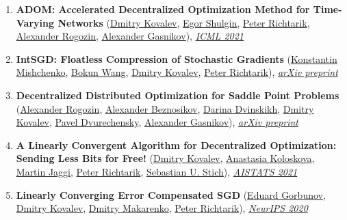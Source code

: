 \begin{enumerate}
\item \textbf{ADOM: Accelerated Decentralized Optimization Method for Time-Varying Networks} (\href{https://www.dmitry-kovalev.com}{\color{linkcolour}Dmitry Kovalev}, \href{https://shulgin-egor.github.io}{\color{linkcolour}Egor Shulgin}, \href{https://richtarik.org}{\color{linkcolour}Peter Richtarik}, \href{https://scholar.google.com/citations?user=sEjyzkgAAAAJ}{\color{linkcolour}Alexander Rogozin}, \href{https://scholar.google.ru/citations?user=AmeE8qkAAAAJ}{\color{linkcolour}Alexander Gasnikov}), \href{http://proceedings.mlr.press/v139/kovalev21a}{\em \color{black}ICML 2021}
\item \textbf{IntSGD: Floatless Compression of Stochastic Gradients} (\href{https://konstmish.github.io}{\color{linkcolour}Konstantin Mishchenko}, \href{https://bokunwang1.github.io}{\color{linkcolour}Bokun Wang}, \href{https://www.dmitry-kovalev.com}{\color{linkcolour}Dmitry Kovalev}, \href{https://richtarik.org}{\color{linkcolour}Peter Richtarik}), \href{https://arxiv.org/abs/2102.08374}{\em \color{black}arXiv preprint}
\item \textbf{Decentralized Distributed Optimization for Saddle Point Problems} (\href{https://scholar.google.com/citations?user=sEjyzkgAAAAJ}{\color{linkcolour}Alexander Rogozin}, \href{https://anbeznosikov.github.io}{\color{linkcolour}Alexander Beznosikov}, \href{https://scholar.google.com/citations?user=5ILnTRsAAAAJ}{\color{linkcolour}Darina Dvinskikh}, \href{https://www.dmitry-kovalev.com}{\color{linkcolour}Dmitry Kovalev}, \href{http://wias-berlin.de/people/dvureche/}{\color{linkcolour}Pavel Dvurechensky}, \href{https://scholar.google.ru/citations?user=AmeE8qkAAAAJ}{\color{linkcolour}Alexander Gasnikov}), \href{https://arxiv.org/abs/2102.07758}{\em \color{black}arXiv preprint}
\item \textbf{A Linearly Convergent Algorithm for Decentralized Optimization: Sending Less Bits for Free!} (\href{https://www.dmitry-kovalev.com}{\color{linkcolour}Dmitry Kovalev}, \href{https://scholar.google.com/citations?user=ldJpvE8AAAAJ}{\color{linkcolour}Anastasia Koloskova}, \href{https://people.epfl.ch/martin.jaggi}{\color{linkcolour}Martin Jaggi}, \href{https://richtarik.org}{\color{linkcolour}Peter Richtarik}, \href{https://sstich.ch}{\color{linkcolour}Sebastian U. Stich}), \href{http://proceedings.mlr.press/v130/kovalev21a}{\em \color{black}AISTATS 2021}
\item \textbf{Linearly Converging Error Compensated SGD} (\href{https://eduardgorbunov.github.io}{\color{linkcolour}Eduard Gorbunov}, \href{https://www.dmitry-kovalev.com}{\color{linkcolour}Dmitry Kovalev}, \href{}{\color{linkcolour}Dmitry Makarenko}, \href{https://richtarik.org}{\color{linkcolour}Peter Richtarik}), \href{https://papers.nips.cc/paper/2020/hash/ef9280fbc5317f17d480e4d4f61b3751-Abstract.html}{\em \color{black}NeurIPS 2020}

\end{enumerate}
